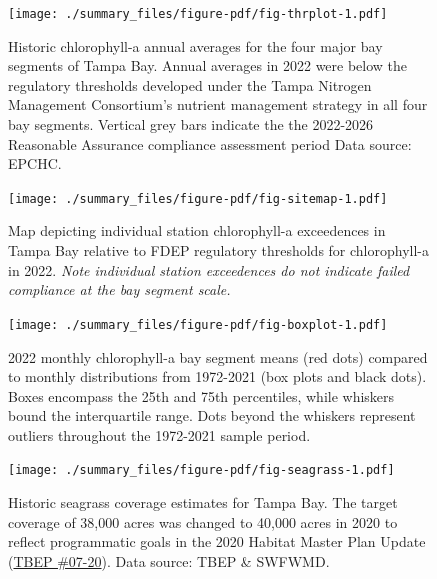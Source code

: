 \documentclass[
  letterpaper,
  DIV=11,
  numbers=noendperiod]{scrreprt}
\begin{document}
\begin{figure}

{\centering \texttt{[image: ./summary\_files/figure-pdf/fig-thrplot-1.pdf]}

}

\caption{\label{fig-thrplot}Historic chlorophyll-a annual averages for
the four major bay segments of Tampa Bay. Annual averages in 2022 were
below the regulatory thresholds developed under the Tampa Nitrogen
Management Consortium's nutrient management strategy in all four bay
segments. Vertical grey bars indicate the the 2022-2026 Reasonable
Assurance compliance assessment period Data source: EPCHC.}

\end{figure}

\begin{figure}

{\centering \texttt{[image: ./summary\_files/figure-pdf/fig-sitemap-1.pdf]}

}

\caption{\label{fig-sitemap}Map depicting individual station
chlorophyll-a exceedences in Tampa Bay relative to FDEP regulatory
thresholds for chlorophyll-a in 2022. \emph{Note individual station
exceedences do not indicate failed compliance at the bay segment
scale.}}

\end{figure}

\begin{figure}

{\centering \texttt{[image: ./summary\_files/figure-pdf/fig-boxplot-1.pdf]}

}

\caption{\label{fig-boxplot}2022 monthly chlorophyll-a bay segment means
(red dots) compared to monthly distributions from 1972-2021 (box plots
and black dots). Boxes encompass the 25th and 75th percentiles, while
whiskers bound the interquartile range. Dots beyond the whiskers
represent outliers throughout the 1972-2021 sample period.}

\end{figure}

\begin{figure}

{\centering \texttt{[image: ./summary\_files/figure-pdf/fig-seagrass-1.pdf]}

}

\caption{\label{fig-seagrass}Historic seagrass coverage estimates for
Tampa Bay. The target coverage of 38,000 acres was changed to 40,000
acres in 2020 to reflect programmatic goals in the 2020 Habitat Master
Plan Update
(\href{https://drive.google.com/file/d/1Hp0l_qtbxp1JxKJoGatdyuANSzQrpL0I/view?usp=drivesdk}{TBEP
\#07-20}). Data source: TBEP \& SWFWMD.}

\end{figure}
\end{document}
